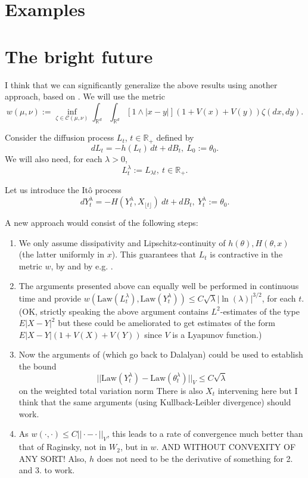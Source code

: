 \documentclass[a4paper,draft]{article}
\begin{document}
\section{Examples}\label{examples}

\section{The bright future}

I think that we can significantly generalize the above results using another approach, based on
\cite{eberle}. We will use the metric
$$
w(\mu,\nu):=\inf_{\zeta\in\mathcal{C}(\mu,\nu)}\int_{\mathbb{R}^d}\int_{\mathbb{R}^d} [1\wedge |x-y|](1+V(x)+V(y))\zeta(dx,dy).
$$

Consider the diffusion process $L_t$, $t\in\mathbb{R}_+$ defined by
$$
dL_t=-h(L_t)\, dt+ dB_t,\ L_0:=\theta_0.
$$
We will also need, for each $\lambda>0$,
$$
L^{\lambda}_t:=L_{\lambda t},\ t\in\mathbb{R}_+.
$$

Let us introduce the It\^{o} process
$$
dY^{\lambda}_t=-H(Y^{\lambda}_t,X_{\lfloor t\rfloor})\ dt+dB_t,\ Y^{\lambda}_t:=\theta_0.
$$

A new approach would consist of the following steps:

\begin{enumerate}

\item We only assume dissipativity and Lipschitz-continuity of $h(\theta),H(\theta,x)$ (the latter uniformly in $x$).
This guarantees that $L_t$ is contractive in the metric $w$, by \cite{eberle} and by e.g. \cite{unadjusted}.

\item The arguments presented above can equally well be performed in continuous time and
provide $w(\mathrm{Law}(L^{\lambda}_t),\mathrm{Law}(Y^{\lambda}_t))\leq C\sqrt{\lambda}|\ln(\lambda)|^{3/2}$,
for each $t$. (OK, strictly speaking the above argument contains $L^2$-estimates of the type $E|X-Y|^2$ but these
could be ameliorated to get estimates of the form $E|X-Y|(1+V(X)+V(Y))$ since $V$ is a Lyapunov function.)

\item Now the arguments of \cite{unadjusted} (which go back to Dalalyan) could be used to establish
the bound
$$
||\mathrm{Law}(Y^{\lambda}_t)-\mathrm{Law}(\theta^{\lambda}_t)||_{V}\leq C\sqrt{\lambda}
$$
on the weighted total variation norm
There is also $X_t$ intervening here but I think that the same arguments (using Kullback-Leibler
divergence) should work.

\item As $w(\cdot,\cdot)\leq C||\cdot-\cdot||_{V}$, this leads to a rate of convergence much better than
that of Raginsky, not in $W_2$, but in $w$. AND WITHOUT CONVEXITY OF ANY SORT! Also, $h$ does not need to
be the derivative of something for 2. and 3. to work.

\end{enumerate}
\end{document}

